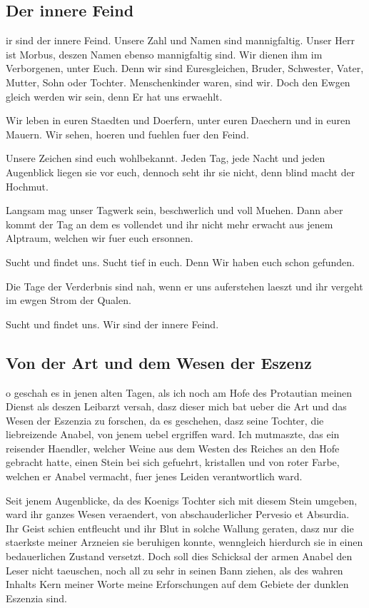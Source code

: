 \documentclass[a5paper,8pt]{book}
\begin{document}
\newpage
\subsection{ Der innere Feind}

ir sind der innere Feind.
Unsere Zahl und Namen sind mannigfaltig.
Unser Herr ist Morbus, deszen Namen ebenso mannigfaltig sind.
Wir dienen ihm im Verborgenen, unter Euch.
Denn wir sind Euresgleichen, Bruder, Schwester, Vater, Mutter, Sohn oder Tochter.
Menschenkinder waren, sind wir. Doch den Ewgen gleich werden wir sein, denn Er hat uns erwaehlt.

Wir leben in euren Staedten und Doerfern, unter euren Daechern und in euren Mauern.
Wir sehen, hoeren und fuehlen fuer den Feind.

Unsere Zeichen sind euch wohlbekannt.
Jeden Tag, jede Nacht und jeden Augenblick liegen sie vor euch, dennoch seht ihr sie nicht, denn blind macht der Hochmut.

Langsam mag unser Tagwerk sein, beschwerlich und voll Muehen.
Dann aber kommt der Tag an dem es vollendet und ihr nicht mehr erwacht aus jenem Alptraum, welchen wir fuer euch ersonnen.

Sucht und findet uns.
Sucht tief in euch. Denn Wir haben euch schon gefunden.

Die Tage der Verderbnis sind nah, wenn er uns auferstehen laeszt und ihr vergeht im ewgen Strom der Qualen.

Sucht und findet uns.
Wir sind der innere Feind.

\newpage

\subsection{ Von der Art und dem Wesen der Eszenz}

o geschah es in jenen alten Tagen, als ich noch am Hofe des Protautian meinen Dienst als deszen Leibarzt versah, dasz dieser mich bat ueber die Art und das Wesen der Eszenzia zu forschen, da es geschehen, dasz seine Tochter, die liebreizende Anabel, von jenem uebel ergriffen ward. Ich mutmaszte, das ein reisender Haendler, welcher Weine aus dem Westen des Reiches an den Hofe gebracht hatte, einen Stein bei sich gefuehrt, kristallen und von roter Farbe, welchen er Anabel vermacht, fuer jenes Leiden verantwortlich ward.

Seit jenem Augenblicke, da des Koenigs Tochter sich mit diesem Stein umgeben, ward ihr ganzes Wesen veraendert, von abschauderlicher Pervesio et Absurdia. Ihr Geist schien entfleucht und ihr Blut in solche Wallung geraten, dasz nur die staerkste meiner Arzneien sie beruhigen konnte, wenngleich hierdurch sie in einen bedauerlichen Zustand versetzt.
Doch soll dies Schicksal der armen Anabel den Leser nicht taeuschen, noch all zu sehr in seinen Bann ziehen, als des wahren Inhalts Kern meiner Worte meine Erforschungen auf dem Gebiete der dunklen Eszenzia sind.
\end{document}
